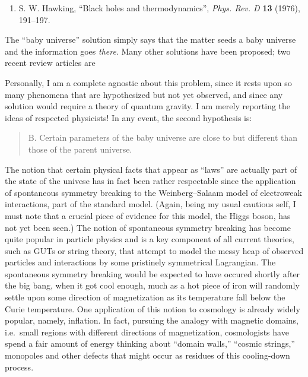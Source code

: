 \documentclass[12pt]{article}
\def\tightlist{}
\renewcommand{\texttt}[1]{%
  \begingroup
  \ttfamily
  \begingroup\lccode`~=`/\lowercase{\endgroup\def~}{/\discretionary{}{}{}}%
  \begingroup\lccode`~=`[\lowercase{\endgroup\def~}{[\discretionary{}{}{}}%
  \begingroup\lccode`~=`.\lowercase{\endgroup\def~}{.\discretionary{}{}{}}%
  \catcode`/=\active\catcode`[=\active\catcode`.=\active
  \scantokens{#1\noexpand}%
  \endgroup
}
\begin{document}
\begin{enumerate}
\def\labelenumi{\arabic{enumi})}
\setcounter{enumi}{1}
\tightlist
\item
  S. W. Hawking, ``Black holes and thermodynamics'', \emph{Phys. Rev. D} \textbf{13} 
  (1976), 191--197.
\end{enumerate}

The ``baby universe'' solution simply says that the matter seeds a baby
universe and the information goes \emph{there}. Many other solutions
have been proposed; two recent review articles are

\noindent
Personally, I am a complete agnostic about this problem, since it rests
upon so many phenomena that are hypothesized but not yet observed, and
since any solution would require a theory of quantum gravity. I am
merely reporting the ideas of respected physicists! In any event, the
second hypothesis is:

\begin{quote}
B. Certain parameters of the baby universe are close to but different
than those of the parent universe.
\end{quote}

 The notion that certain physical
facts that appear as ``laws'' are actually part of the state of the
univese has in fact been rather respectable since the application of
spontaneous symmetry breaking to the Weinberg--Salaam model of electroweak
interactions, part of the standard model. (Again, being my usual
cautious self, I must note that a crucial piece of evidence for this
model, the Higgs boson, has not yet been seen.) The notion of
spontaneous symmetry breaking has become quite popular in particle
physics and is a key component of all current theories, such as GUTs or
string theory, that attempt to model the messy heap of observed
particles and interactions by some pristinely symmetrical Lagrangian.
The spontaneous symmetry breaking would be expected to have occured
shortly after the big bang, when it got cool enough, much as a hot piece
of iron will randomly settle upon some direction of magnetization as its
temperature fall below the Curie temperature. One application of this
notion to cosmology is already widely popular, namely, inflation. In
fact, pursuing the analogy with magnetic domains, i.e.~small regions
with different directions of magnetization, cosmologists have spend a
fair amount of energy thinking about ``domain walls,'' ``cosmic
strings,'' monopoles and other defects that might occur as residues of
this cooling-down process.
\end{document}
